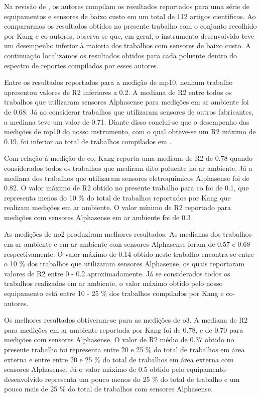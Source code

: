 Na revisão de \cite{Kang2022PerformanceReview}, os autores compilam os resultados reportados para uma série de equipamentos e sensores de baixo custo em um total de 112 artigos científicos. Ao compararmos os resultados obtidos no presente trabalho com o conjunto recolhido por Kang e co-autores, observa-se que, em geral, o instrumento desenvolvido teve um desempenho inferior à maioria dos trabalhos com sensores de baixo custo. A continuação localizamos os resultados obtidos para cada poluente dentro do espectro de reportes compilados por esses autores.

Entre os resultados reportados para a medição de \acrshort{mp10}, nenhum trabalho apresentou valores de R2 inferiores a 0.2. A mediana de R2 entre todos os trabalhos que utilizaram sensores Alphasense para medições em ar ambiente foi de 0.68. Já ao considerar trabalhos que utilizaram sensores de outros fabricantes, a mediana teve um valor de 0.71. Diante disso conclui-se que o desempenho das medições de \acrshort{mp10} do nosso instrumento, com o qual obteve-se um R2 máximo de 0.19, foi inferior ao total de trabalhos compilados em \cite{Kang2022PerformanceReview}.

Com relação à medição de \acrshort{co}, Kang reporta uma mediana de R2 de 0.78 quando considerados todos os trabalhos que mediram dito poluente no ar ambiente. Já a mediana dos trabalhos que utilizaram sensores eletroquímicos Alphasense foi de 0.82. O valor máximo de R2 obtido no presente trabalho para \acrshort{co} foi de 0.1, que representa menos do 10 \% do total de trabalhos reportados por Kang que realizam medições em ar ambiente. O valor mínimo de R2 reportado para medições com sensores Alphasense em ar ambiente foi de 0.3

As medições de \acrshort{no2} produziram melhores resultados. As medianas dos trabalhos em ar ambiente e em ar ambiente com sensores Alphasense foram de 0.57 e 0.68 respectivamente. O valor máximo de 0.14 obtido neste trabalho encontra-se entre o 10 \% dos trabalhos que utilizaram sensores Alphasense, os quais reportaram valores de R2 entre 0 - 0.2 aproximadamente. Já se considerados todos os trabalhos realizados em ar ambiente, o valor máximo obtido pelo nosso equipamento está entre 10 - 25 \% dos trabalhos compilados por Kang e co-autores.

Os melhores resultados obtiveram-se para as medições de \acrshort{o3}. A mediana de R2 para medições em ar ambiente reportada por Kang foi de 0.78, e de 0.70 para medições com sensores Alphasense. O valor de R2 médio de 0.37 obtido no presente trabalho  foi representa entre 20 e 25 \% do total de trabalhos em área externa e entre entre 20 e 25 \% do total de trabalhos em área externa com sensores Alphasense. Já o valor máximo de 0.5 obtido pelo equipamento desenvolvido representa um pouco menos do 25 \% do total de trabalho e um pouco mais de 25 \% do total de trabalhos com sensores Alphasense.


